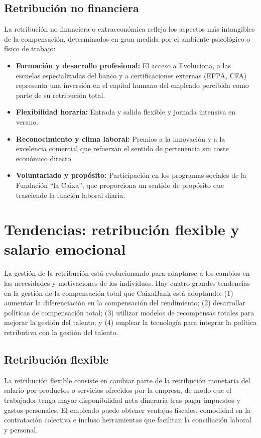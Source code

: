 \subsection{Retribución no financiera}

La retribución no financiera o extraeconómica refleja los aspectos más intangibles de la compensación, determinados en gran medida por el ambiente psicológico o físico de trabajo:

\begin{itemize}
    \item \textbf{Formación y desarrollo profesional:} El acceso a Evoluciona, a las escuelas especializadas del banco y a certificaciones externas (EFPA, CFA) representa una inversión en el capital humano del empleado percibida como parte de su retribución total.
    \item \textbf{Flexibilidad horaria:} Entrada y salida flexible y jornada intensiva en verano.
    \item \textbf{Reconocimiento y clima laboral:} Premios a la innovación y a la excelencia comercial que refuerzan el sentido de pertenencia sin coste económico directo.
    \item \textbf{Voluntariado y propósito:} Participación en los programas sociales de la Fundación ``la Caixa'', que proporciona un sentido de propósito que trasciende la función laboral diaria.
\end{itemize}

\section{Tendencias: retribución flexible y salario emocional}

La gestión de la retribución está evolucionando para adaptarse a los cambios en las necesidades y motivaciones de los individuos. Hay cuatro grandes tendencias en la gestión de la compensación total que CaixaBank está adoptando: (1) aumentar la diferenciación en la compensación del rendimiento; (2) desarrollar políticas de compensación total; (3) utilizar modelos de recompensas totales para mejorar la gestión del talento; y (4) emplear la tecnología para integrar la política retributiva con la gestión del talento.

\subsection{Retribución flexible}

La retribución flexible consiste en cambiar parte de la retribución monetaria del salario por productos o servicios ofrecidos por la empresa, de modo que el trabajador tenga mayor disponibilidad neta dineraria tras pagar impuestos y gastos personales. El empleado puede obtener ventajas fiscales, comodidad en la contratación colectiva e incluso herramientas que facilitan la conciliación laboral y personal.

